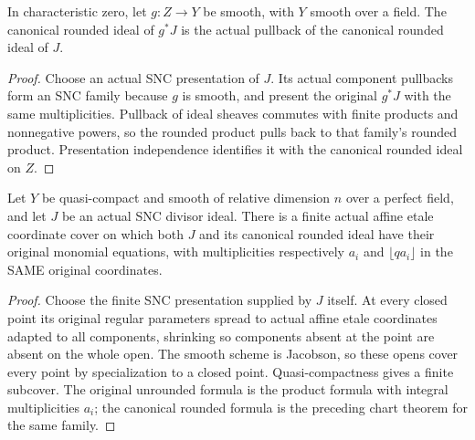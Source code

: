 \begin{lemma}
\label{lem:rounded-snc-original-smooth-pullback}
\leanok
In characteristic zero, let $g:Z\to Y$ be smooth, with $Y$ smooth over a
field. The canonical rounded ideal of $g^*J$ is the actual pullback of the
canonical rounded ideal of $J$.
\end{lemma}
\begin{proof}
Choose an actual SNC presentation of $J$. Its actual component pullbacks
form an SNC family because $g$ is smooth, and present the original $g^*J$
with the same multiplicities. Pullback of ideal sheaves commutes with
finite products and nonnegative powers, so the rounded product pulls back
to that family's rounded product. Presentation independence identifies it
with the canonical rounded ideal on $Z$.
\end{proof}

\begin{theorem}
\label{thm:rounded-snc-original-finite-charts}
\leanok
Let $Y$ be quasi-compact and smooth of relative dimension $n$ over a
perfect field, and let $J$ be an actual SNC divisor ideal. There is a
finite actual affine etale coordinate cover on which both $J$ and its
canonical rounded ideal have their original monomial equations, with
multiplicities respectively $a_i$ and $\lfloor qa_i\rfloor$ in the SAME
original coordinates.
\end{theorem}
\begin{proof}
Choose the finite SNC presentation supplied by $J$ itself. At every closed
point its original regular parameters spread to actual affine etale
coordinates adapted to all components, shrinking so components absent at
the point are absent on the whole open. The smooth scheme is Jacobson, so
these opens cover every point by specialization to a closed point.
Quasi-compactness gives a finite subcover. The original unrounded formula
is the product formula with integral multiplicities $a_i$; the canonical
rounded formula is the preceding chart theorem for the same family.
\end{proof}
